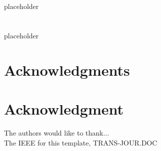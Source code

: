 \documentclass[10pt,journal,compsoc]{IEEEtran}
\begin{document}
%


\appendices
\section{}
placeholder

\section{}
placeholder


\ifCLASSOPTIONcompsoc
  \section*{Acknowledgments}
\else
  \section*{Acknowledgment}
\fi


The authors would like to thank...\\
The IEEE for this template, TRANS-JOUR.DOC


\ifCLASSOPTIONcaptionsoff
  \newpage
\fi



\end{document}
